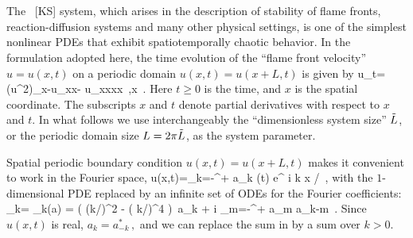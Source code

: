 

\section{\KSe}
\label{s-KS}


The \KS\ [KS] system, which
arises in the description of stability of
flame fronts, reaction-diffusion systems and many other physical settings,
is one of the simplest nonlinear PDEs that
exhibit spatiotemporally chaotic behavior.
In the formulation adopted here, the time evolution of the 
``flame front velocity'' $u=u(x,t)$ on a periodic domain
$u(x,t) = u(x+L,t)$
is given by
\beq
    u_t=(u^2)_x-u_{xx}- u_{xxxx}
    \,,\qquad   x \in [0,L]
    \,.
Here $t \geq 0$ is the time, and
$x$ is the spatial coordinate.
The subscripts $x$ and $t$ denote partial derivatives with respect to
$x$ and $t$. In what follows we use interchangeably the ``dimensionless
system size'' $\tilde{L}$, or the periodic domain size $L= 2\pi \tilde{L}$,
as the system parameter.

Spatial periodic boundary condition $u(x,t)=u(x+L,t)$
makes it convenient to work in the Fourier space, 
\beq
  u(x,t)=\sum_{k=-\infty}^{+\infty} a_k (t) e^{ i k x /\tildeL }
\,,
with the $1$-dimensional PDE 
replaced by an infinite set of 
ODEs for the Fourier coefficients:
\beq
{}_k= \pVeloc_k(a)
	 = ( (k/\tildeL)^2 - ( k/\tildeL)^4 )\, a_k 
    + i  \sum_{m=-\infty}^{+\infty} a_m a_{k-m}
\,.
Since $u(x,t)$ is real,
$ %
a_k=a_{-k}^*
\,,
$ %
and we can replace the sum in  by a
sum over $k > 0$.

